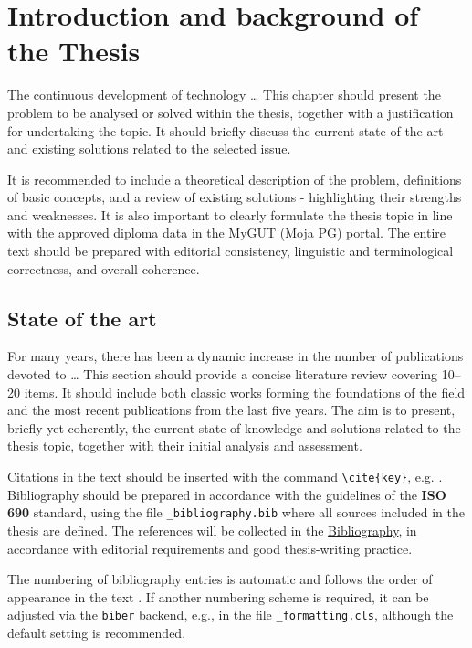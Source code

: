\chapter{Introduction and background of the Thesis}\label{chapter:1_Introduction}
The continuous development of technology \dots \: This chapter should present the problem to be analysed or solved within the thesis, together with a justification for undertaking the topic. It should briefly discuss the current state of the art and existing solutions related to the selected issue.

It is recommended to include a theoretical description of the problem, definitions of basic concepts, and a review of existing solutions - highlighting their strengths and weaknesses. It is also important to clearly formulate the thesis topic in line with the approved diploma data in the MyGUT (Moja PG) portal. The entire text should be prepared with editorial consistency, linguistic and terminological correctness, and overall coherence.

\section{State of the art}
For many years, there has been a dynamic increase in the number of publications devoted to \dots \: This section should provide a concise literature review covering 10–20 items. It should include both classic works forming the foundations of the field and the most recent publications from the last five years. The aim is to present, briefly yet coherently, the current state of knowledge and solutions related to the thesis topic, together with their initial analysis and assessment.

Citations in the text should be inserted with the command \verb|\cite{key}|, e.g. \cite{DeanGhemawat2004MapReduce}. Bibliography should be prepared in accordance with the guidelines of the \textbf{ISO 690} standard, using the file \verb|_bibliography.bib| where all sources included in the thesis are defined. The references \cite{HorowitzHill2015AoE} will be collected in the \hyperref[page:Bibliography]{Bibliography}, in accordance with editorial requirements and good thesis-writing practice.

The numbering of bibliography entries is automatic and follows the order of appearance in the text \cite{Kalman1960NewApproach}. If another numbering scheme is required, it can be adjusted via the \texttt{biber} backend, e.g., in the file \verb|_formatting.cls|, although the default setting is recommended.

